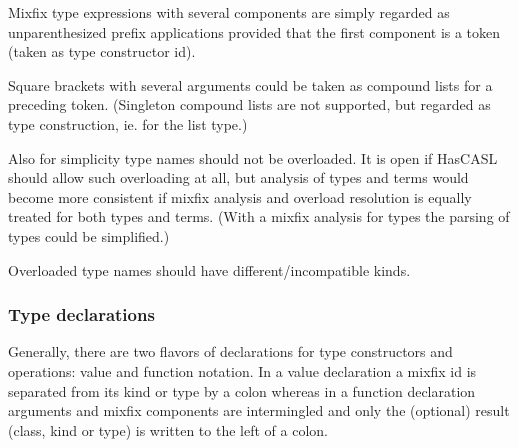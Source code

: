 \documentclass{article}
\begin{document}
Mixfix type expressions with several components are simply regarded as
unparenthesized prefix applications provided that the first component is a
token (taken as type constructor id). 

Square brackets with several arguments could be taken as compound lists for a
preceding token. (Singleton compound lists are not supported, but regarded as
type construction, ie. for the list type.)

Also for simplicity type names should not be overloaded. It is open if HasCASL
should allow such overloading at all, but analysis of types and terms would
become more consistent if mixfix analysis and overload resolution is equally
treated for both types and terms. (With a mixfix analysis for types the
parsing of types could be simplified.)

Overloaded type names should have different/incompatible kinds. 

\subsubsection*{Type declarations}

Generally, there are two flavors of declarations for type constructors and
operations: value and function notation. In a value declaration a mixfix id is
separated from its kind or type by a colon whereas in a function declaration
arguments and mixfix components are intermingled and only the (optional)
result (class, kind or type) is written to the left of a colon. 


   
\end{document}
